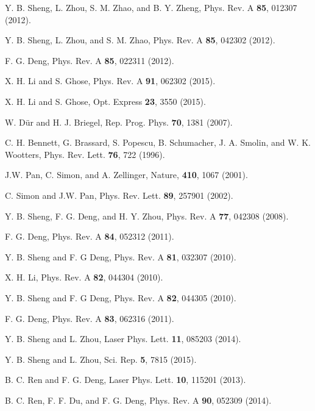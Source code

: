 \documentclass[aps,graphicx,twocolumn]{revtex4}%
\begin{document}
\begin{thebibliography}{199}
Y. B.  Sheng, L. Zhou, S. M. Zhao, and B. Y. Zheng, Phys. Rev. A \textbf{85}, 012307   (2012).


Y. B.  Sheng, L. Zhou, and S. M. Zhao, Phys. Rev. A  \textbf{85}, 042302 (2012).


 F. G. Deng,   Phys. Rev. A \textbf{85},
022311 (2012).


X. H. Li and S. Ghose,  Phys. Rev. A \textbf{91}, 062302 (2015).


X. H. Li and S. Ghose,  Opt. Express \textbf{23}, 3550 (2015).



W. D\"{u}r and H. J. Briegel,  Rep. Prog. Phys. \textbf{70}, 1381 (2007).


C. H. Bennett, G. Brassard, S. Popescu, B. Schumacher, J. A. Smolin, and W. K.  Wootters,   Phys. Rev.  Lett. \textbf{76}, 722 (1996).



J.W. Pan, C. Simon, and  A.  Zellinger,   Nature,
\textbf{410}, 1067 (2001).

C. Simon and J.W.  Pan,    Phys. Rev.
Lett. \textbf{89}, 257901 (2002).

Y. B. Sheng,  F. G. Deng, and H. Y. Zhou,    Phys. Rev. A \textbf{77}, 042308 (2008).

 F. G. Deng,   Phys. Rev. A \textbf{84}, 052312 (2011).

Y. B. Sheng and F. G Deng,   Phys. Rev. A \textbf{81}, 032307 (2010).



X. H. Li,   Phys. Rev.
A \textbf{82}, 044304 (2010).

Y. B. Sheng and F. G Deng,   Phys. Rev. A \textbf{82}, 044305
(2010).

F. G.  Deng,     Phys.  Rev.
A \textbf{83}, 062316 (2011).


 Y. B. Sheng and L. Zhou,   Laser Phys. Lett. \textbf{11}, 085203  (2014).

Y. B. Sheng and L. Zhou, Sci. Rep. \textbf{5}, 7815 (2015).


 B. C. Ren and F. G.  Deng,  Laser Phys. Lett. \textbf{10}, 115201 (2013).

 B. C. Ren, F. F. Du, and F. G.  Deng,   Phys. Rev. A \textbf{90}, 052309 (2014).


\end{thebibliography}
\end{document}
